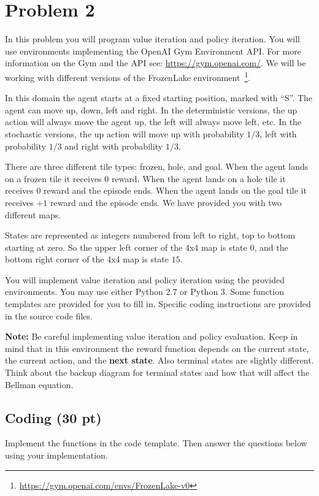 \documentclass[12pt]{article}
\begin{document}
\section*{Problem 2}

In this problem you will program value iteration and policy
iteration. You will use environments implementing the OpenAI Gym
Environment API. For more information on the Gym and the API see:
\url{https://gym.openai.com/}. We will be working with different
versions of the FrozenLake
environment~\footnote{\url{https://gym.openai.com/envs/FrozenLake-v0}}.

In this domain the agent starts at a fixed starting position, marked
with ``S''. The agent can move up, down, left and right. In the
deterministic versions, the up action will always move the agent up,
the left will always move left, etc. In the stochastic versions, the
up action will move up with probability $1/3$, left with probability $1/3$
and right with probability $1/3$.

There are three different tile types: frozen, hole, and goal. When the
agent lands on a frozen tile it receives $0$ reward. When the agent
lands on a hole tile it receives $0$ reward and the episode ends. When
the agent lands on the goal tile it receives $+1$ reward and the episode
ends. We have provided you with two different maps.

States are represented as integers numbered from left to right, top to
bottom starting at zero. So the upper left corner of the 4x4 map is
state $0$, and the bottom right corner of the 4x4 map is state $15$.

You will implement value iteration and policy iteration using the
provided environments. You may use either Python 2.7 or Python 3. Some
function templates are provided for you to fill in. Specific coding
instructions are provided in the source code files.

\textbf{Note:} Be careful implementing value iteration and policy
evaluation. Keep in mind that in this environment the reward function
depends on the current state, the current action, and the \textbf{next
state}. Also terminal states are slightly different. Think about the
backup diagram for terminal states and how that will affect the
Bellman equation.

\subsection*{Coding (30 pt)}

Implement the functions in the code template. Then answer the questions below
using your implementation.
\end{document}

